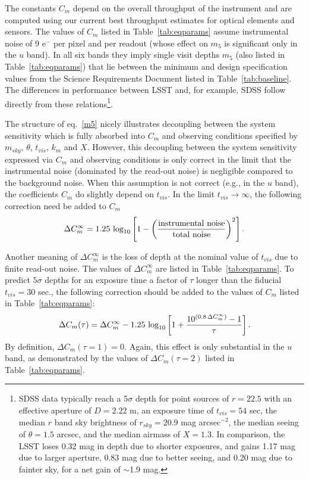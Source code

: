 The constants $C_m$ depend on the overall throughput of the instrument
and are computed using our current best throughput estimates for
optical elements and sensors. The values of $C_m$ listed in Table~\ref{tab:eqparams} 
assume instrumental noise of 9 e$^-$ per pixel and per readout (whose effect on $m_5$
is significant only in the $u$ band). In all six bands they imply single visit depths $m_5$ 
(also listed in Table~\ref{tab:eqparams}) that lie between the minimum and design
specification values from the Science Requirements
Document listed in Table~\ref{tab:baseline}.
The differences in performance between LSST and, for example, SDSS
follow directly from these relations\footnote{SDSS data
typically reach a 5$\sigma$ depth for point sources of $r=22.5$
with an effective aperture of $D=2.22$ m, an exposure time of $t_{vis}=54$
sec, the median $r$ band sky brightness of $r_{sky}=20.9$ mag arcsec$^{-2}$,
the median seeing of $\theta=1.5$ arcsec, and the median airmass of $X=1.3$.
In comparison, the LSST loses 0.32 mag in depth due to shorter exposures,
and gains 1.17 mag due to larger aperture, 0.83 mag due to better
seeing, and 0.20 mag due to fainter sky, for a net gain of $\sim$1.9 mag.}.

The structure of eq.~\ref{m5} nicely illustrates decoupling between the system
sensitivity which is fully absorbed into $C_m$ and observing conditions
specified by $m_{sky}$, $\theta$, $t_{vis}$, $k_m$
and $X$. However, this decoupling between the system sensitivity 
expressed via $C_m$ and observing conditions is only correct in the limit that the instrumental noise 
(dominated by the read-out noise) is negligible compared to the background noise. When this assumption 
is not correct (e.g., in the $u$ band), the coefficients $C_m$ do slightly depend on $t_{vis}$. In the limit 
$t_{vis} \rightarrow \infty$, the following correction need be added to $C_m$
\begin{equation}
\Delta C^\infty_m = 1.25 \,\log_{10}\left[1 - \left({\rm instrumental \,\, noise} \over {\rm total \,\, noise}    \right)^2\right]. 
\end{equation}

Another meaning of $\Delta C^\infty_m$ is the loss of depth at the nominal value of $t_{vis}$ due to finite 
read-out noise. The values of  $\Delta C^\infty_m$ are listed in Table~\ref{tab:eqparams}. To predict 
$5\sigma$ depths for an exposure time a factor of $\tau$ longer than the fiducial $t_{vis} = 30$ sec., the
following correction should be added to the values of $C_m$ listed in Table~\ref{tab:eqparams}:
\begin{equation}
\label{eq:DCm}
 \Delta C_m(\tau) = \Delta C^\infty_m - 1.25\,\log_{10}\left[1 + {10^{(0.8 \, \Delta C^\infty_m)} - 1 \over \tau}  \right].
\end{equation}
By definition, $\Delta C_m(\tau=1)=0$. Again, this effect is only substantial in the $u$
band, as demonstrated by the values of $\Delta C_m(\tau = 2)$ listed in Table~\ref{tab:eqparams}.

